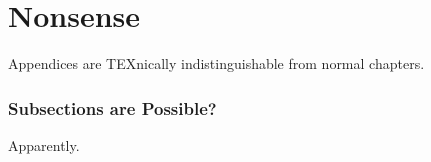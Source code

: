 
\chapter{Nonsense}
\label{appendix}
Appendices are TEXnically indistinguishable from normal chapters. 

\subsection*{Subsections are Possible?}

Apparently.



